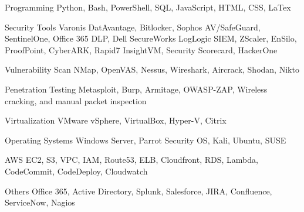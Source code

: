 
\begin{cvskills}
  \cvskill
    {Programming} %
    {Python, Bash, PowerShell, SQL, JavaScript, HTML, CSS, LaTex} %

  \cvskill
    {Security Tools} %
    {Varonis DatAvantage, Bitlocker, Sophos AV/SafeGuard, SentinelOne, Office 365 DLP, Dell SecureWorks \newline
    LogLogic SIEM, ZScaler, EnSilo, ProofPoint, CyberARK, Rapid7 InsightVM, Security Scorecard, HackerOne} %

  \cvskill
     {Vulnerability Scan} %
     {NMap, OpenVAS, Nessus, Wireshark, Aircrack, Shodan, Nikto} %
 
  \cvskill
     {Penetration Testing} %
     {Metasploit, Burp, Armitage, OWASP-ZAP, Wireless cracking, and manual packet inspection} %
 
  \cvskill
    {Virtualization} %
    {VMware vSphere, VirtualBox, Hyper-V, Citrix} %

  \cvskill
    {Operating Systems} %
    {Windows Server, Parrot Security OS, Kali, Ubuntu, SUSE} %

  \cvskill
    {AWS} %
    {EC2, S3, VPC, IAM, Route53, ELB, Cloudfront, RDS, Lambda, CodeCommit, CodeDeploy, Cloudwatch} %

  \cvskill
    {Others} %
    {Office 365, Active Directory, Splunk, Salesforce, JIRA, Confluence, ServiceNow, Nagios} %

\end{cvskills}
